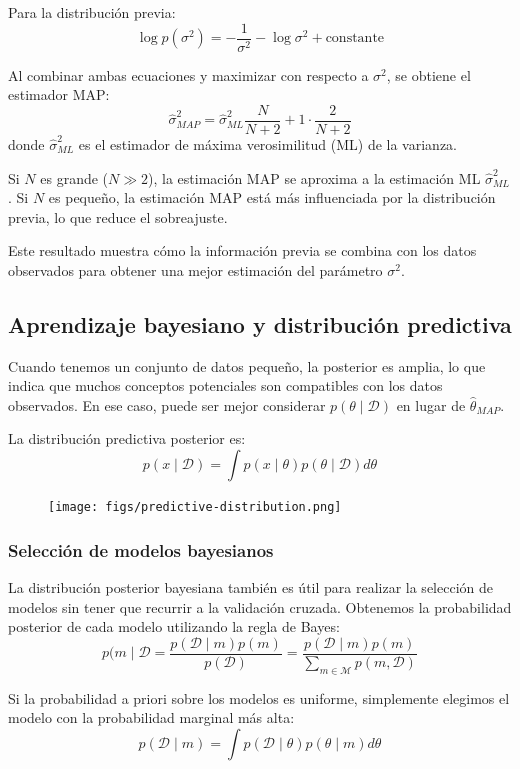 Para la distribución previa:
$$ \log p(\sigma^2) = -\frac{1}{\sigma^2} - \log \sigma^2 + \text{constante}$$

Al combinar ambas ecuaciones y maximizar con respecto a $\sigma^2$, se obtiene el estimador MAP:
$$\hat{\sigma}^2_{MAP} = \hat{\sigma}^2_{ML} \frac{N}{N+2} + 1 \cdot \frac{2}{N+2}$$
donde $\hat{\sigma}^2_{ML}$ es el estimador de máxima verosimilitud (ML) de la varianza.

Si $N$ es grande ($N \gg 2$), la estimación MAP se aproxima a la estimación ML $\hat{\sigma}^2_{ML}$. Si $N$ es pequeño, la estimación MAP está más influenciada por la distribución previa, lo que reduce el sobreajuste.

Este resultado muestra cómo la información previa se combina con los datos observados para obtener una mejor estimación del parámetro $\sigma^2$.

\subsection{Aprendizaje bayesiano y distribución predictiva}
Cuando tenemos un conjunto de datos pequeño, la posterior es amplia, lo que indica que muchos conceptos potenciales son compatibles con los datos observados.
En ese caso, puede ser mejor considerar $p(\theta \mid \mathcal{D})$ en lugar de $\hat{\theta}_{MAP}$.

La distribución predictiva posterior es:
$$p(x \mid \mathcal{D}) = \int p(x \mid \theta) p(\theta \mid \mathcal{D}) d\theta$$

\begin{figure}[h]
\centering
\texttt{[image: figs/predictive-distribution.png]}
\end{figure}

\subsubsection{Selección de modelos bayesianos}
La distribución posterior bayesiana también es útil para realizar la selección de modelos sin tener que recurrir a la validación cruzada. Obtenemos la probabilidad posterior de cada modelo utilizando la regla de Bayes:
$$p(m \mid \mathcal{D} = \frac{p(\mathcal{D} \mid m) p(m)}{p(\mathcal{D})} = \frac{p(\mathcal{D} \mid m) p(m)}{\sum_{m \in \mathcal{M}} p(m, \mathcal{D})}$$

Si la probabilidad a priori sobre los modelos es uniforme, simplemente elegimos el modelo con la probabilidad marginal más alta:
$$p(\mathcal{D} \mid m) = \int p(\mathcal{D} \mid \theta) p(\theta \mid m) d\theta$$

